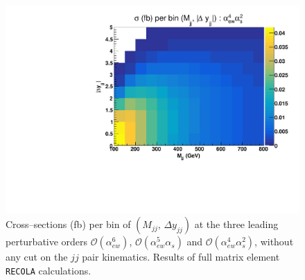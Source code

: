 \begin{figure}[ht]
\includegraphics[scale=0.395]{figures/scanfigures/scan_ew4qcd2.pdf}
\caption{Cross--sections (fb) per bin of $(M_{jj},\,\Delta y_{jj})$ at the three leading perturbative orders $\mathcal{O}(\alpha_{ew}^6)$, $\mathcal{O}(\alpha_{ew}^5\alpha_s)$ and $\mathcal{O}(\alpha_{ew}^4 \alpha_s^2)$, without any cut on the $jj$ pair kinematics. Results of full matrix element \texttt{RECOLA} calculations.}\label{fig:mjjdyjj_2d_LO}
\end{figure}
